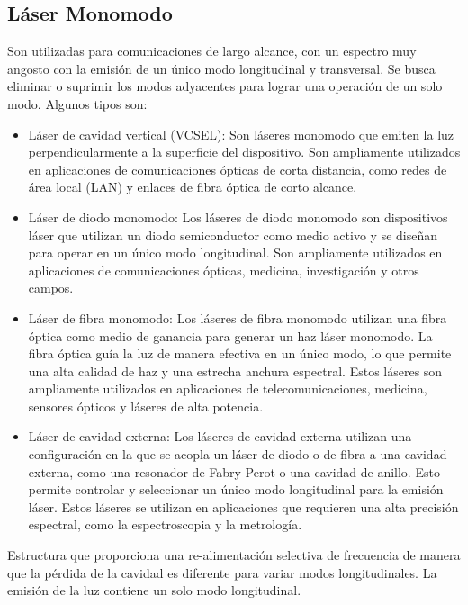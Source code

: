 \documentclass[
	12pt, %
	fleqn, %
	a4paper, %
	oneside, %
]{LegrandOrangeBook}
\begin{document}
\subsection{Láser Monomodo}
Son utilizadas para comunicaciones de largo alcance, con un espectro muy angosto con la emisión de un único modo longitudinal y transversal. Se busca eliminar o suprimir los modos adyacentes para lograr una operación de un solo modo. Algunos tipos son:
\begin{itemize}
\item Láser de cavidad vertical (VCSEL): Son láseres monomodo que emiten la luz perpendicularmente a la superficie del dispositivo. Son ampliamente utilizados en aplicaciones de comunicaciones ópticas de corta distancia, como redes de área local (LAN) y enlaces de fibra óptica de corto alcance.
\item Láser de diodo monomodo: Los láseres de diodo monomodo son dispositivos láser que utilizan un diodo semiconductor como medio activo y se diseñan para operar en un único modo longitudinal. Son ampliamente utilizados en aplicaciones de comunicaciones ópticas, medicina, investigación y otros campos.
\item Láser de fibra monomodo: Los láseres de fibra monomodo utilizan una fibra óptica como medio de ganancia para generar un haz láser monomodo. La fibra óptica guía la luz de manera efectiva en un único modo, lo que permite una alta calidad de haz y una estrecha anchura espectral. Estos láseres son ampliamente utilizados en aplicaciones de telecomunicaciones, medicina, sensores ópticos y láseres de alta potencia.
\item Láser de cavidad externa: Los láseres de cavidad externa utilizan una configuración en la que se acopla un láser de diodo o de fibra a una cavidad externa, como una resonador de Fabry-Perot o una cavidad de anillo. Esto permite controlar y seleccionar un único modo longitudinal para la emisión láser. Estos láseres se utilizan en aplicaciones que requieren una alta precisión espectral, como la espectroscopia y la metrología.
\end{itemize}
Estructura que proporciona una re-alimentación selectiva de frecuencia de manera que la pérdida de la cavidad es diferente para variar modos longitudinales. La emisión de la luz contiene un solo modo longitudinal.
\end{document}
